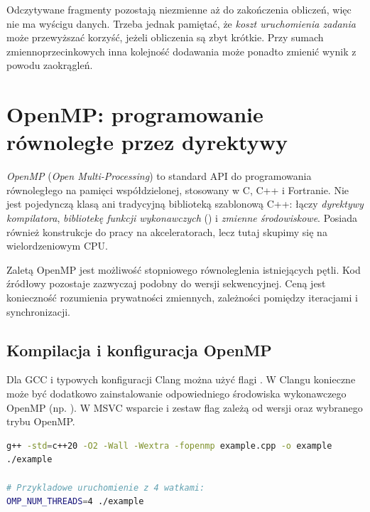 Odczytywane fragmenty  pozostają niezmienne aż do zakończenia
obliczeń, więc nie ma wyścigu danych. Trzeba jednak pamiętać, że
\emph{koszt uruchomienia zadania} może przewyższać korzyść, jeżeli
obliczenia są zbyt krótkie. Przy sumach zmiennoprzecinkowych inna
kolejność dodawania może ponadto zmienić wynik z powodu zaokrągleń.

\section{OpenMP: programowanie równoległe przez dyrektywy}
\label{sec:openmp}

\emph{OpenMP} (\emph{Open Multi-Processing}) to standard API do
programowania równoległego na pamięci współdzielonej, stosowany
w C, C++ i Fortranie. Nie jest pojedynczą klasą ani tradycyjną
biblioteką szablonową C++: łączy \emph{dyrektywy kompilatora},
\emph{bibliotekę funkcji wykonawczych} () i \emph{zmienne
środowiskowe}. Posiada również konstrukcje do pracy na akceleratorach,
lecz tutaj skupimy się na wielordzeniowym CPU.

Zaletą OpenMP jest możliwość stopniowego równoleglenia istniejących pętli.
Kod źródłowy pozostaje zazwyczaj podobny do wersji sekwencyjnej.
Ceną jest konieczność rozumienia prywatności zmiennych, zależności
pomiędzy iteracjami i synchronizacji.


\subsection{Kompilacja i konfiguracja OpenMP}

Dla GCC i typowych konfiguracji Clang można użyć flagi
. W Clangu konieczne może być dodatkowo
zainstalowanie odpowiedniego środowiska wykonawczego OpenMP
(np. ). W MSVC wsparcie i zestaw flag zależą od
wersji oraz wybranego trybu OpenMP.

\begin{lstlisting}[language=bash,caption={Kompilacja programu OpenMP w GCC.}]
g++ -std=c++20 -O2 -Wall -Wextra -fopenmp example.cpp -o example
./example

# Przykladowe uruchomienie z 4 watkami:
OMP_NUM_THREADS=4 ./example
\end{lstlisting}

